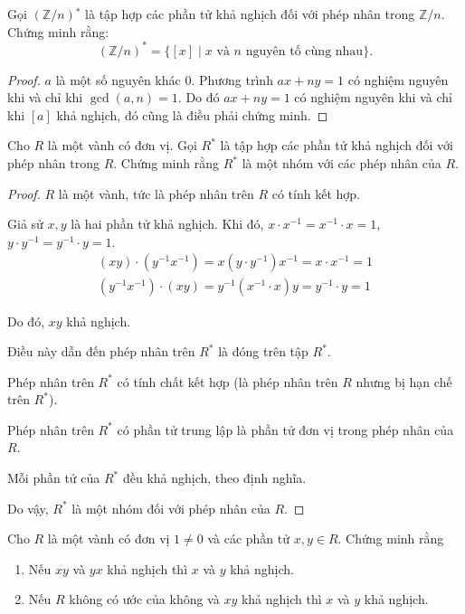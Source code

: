 \begin{exercise}Gọi $(\mathbb{Z}/n){}^{*}$ là tập hợp các phần tử khả nghịch đối với phép nhân trong $\mathbb{Z}/n$. Chứng minh rằng:
    \[ {(\mathbb{Z}/n)}^{*} = \{ [x] \mid \text{$x$ và $n$ nguyên tố cùng nhau} \}. \]
\end{exercise}

\begin{proof}$a$ là một số nguyên khác $0$. Phương trình $ax + ny = 1$ có nghiệm nguyên khi và chỉ khi $\operatorname{gcd}(a, n) = 1$. Do đó $ax + ny = 1$ có nghiệm nguyên khi và chỉ khi $[a]$ khả nghịch, đó cũng là điều phải chứng minh.
\end{proof}

\begin{exercise}
    Cho $R$ là một vành có đơn vị. Gọi $R^{*}$ là tập hợp các phần tử khả nghịch đối với phép nhân trong $R$. Chứng minh rằng $R^{*}$ là một nhóm với các phép nhân của $R$.
\end{exercise}

\begin{proof}
    $R$ là một vành, tức là phép nhân trên $R$ có tính kết hợp.
    
    Giả sử $x, y$ là hai phần tử khả nghịch. Khi đó, $x\cdot x^{-1} = x^{-1}\cdot x = 1$, $y\cdot y^{-1} = y^{-1}\cdot y = 1$.
    \[
        \begin{split}
            (xy)\cdot (y^{-1}x^{-1}) = x(y\cdot y^{-1})x^{-1} = x\cdot x^{-1} = 1 \\
            (y^{-1}x^{-1})\cdot (xy) = y^{-1}(x^{-1}\cdot x)y = y^{-1}\cdot y = 1
        \end{split}
    \]

    Do đó, $xy$ khả nghịch.

    Điều này dẫn đến phép nhân trên $R^{*}$ là đóng trên tập $R^{*}$.
    
    Phép nhân trên $R^{*}$ có tính chất kết hợp (là phép nhân trên $R$ nhưng bị hạn chế trên $R^{*}$).
    
    Phép nhân trên $R^{*}$ có phần tử trung lập là phần tử đơn vị trong phép nhân của $R$.
    
    Mỗi phần tử của $R^{*}$ đều khả nghịch, theo định nghĩa.
    
    Do vậy, $R^{*}$ là một nhóm đối với phép nhân của $R$.
\end{proof}

\begin{exercise}Cho $R$ là một vành có đơn vị $1\ne 0$ và các phần tử $x, y\in R$. Chứng minh rằng
    \begin{enumerate}[label = (\alph*)]
        \item Nếu $xy$ và $yx$ khả nghịch thì $x$ và $y$ khả nghịch.
        \item Nếu $R$ không có ước của không và $xy$ khả nghịch thì $x$ và $y$ khả nghịch.
    \end{enumerate}
\end{exercise}

